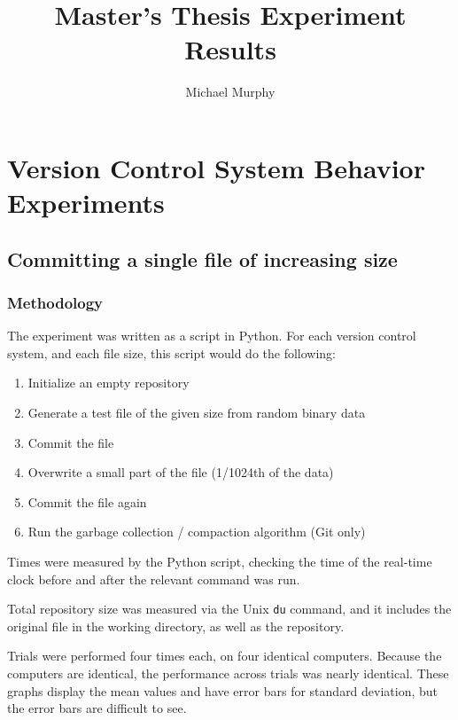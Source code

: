 \documentclass[a4paper]{article}
\begin{document}
\title{Master's Thesis Experiment Results}
\author{Michael Murphy}
\maketitle

\section{Version Control System Behavior Experiments}

\subsection{Committing a single file of increasing size}

\subsubsection{Methodology}

The experiment was written as a script in Python. For each version control
system, and each file size, this script would do the following:

\begin{enumerate}
    \setlength{\itemsep}{0pt}
    \setlength{\parskip}{0pt}
    \setlength{\parsep}{0pt}
    \item Initialize an empty repository
    \item Generate a test file of the given size from random binary data
    \item Commit the file
    \item Overwrite a small part of the file (1/1024th of the data)
    \item Commit the file again
    \item Run the garbage collection / compaction algorithm (Git only)
\end{enumerate}

Times were measured by the Python script, checking the time of the real-time
clock before and after the relevant command was run.

Total repository size was measured via the Unix \lstinline{du} command, and it
includes the original file in the working directory, as well as the repository.

Trials were performed four times each, on four identical computers. Because the
computers are identical, the performance across trials was nearly identical.
These graphs display the mean values and have error bars for standard deviation,
but the error bars are difficult to see.
\end{document}
